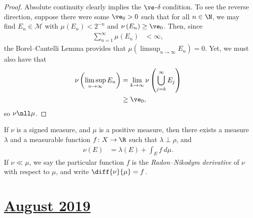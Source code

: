 \documentclass[10pt]{mypackage}
\begin{document}
\begin{proof}
  Absolute continuity clearly implies the $\ve$-$\delta$ condition. To see the reverse direction, suppose there were some $\ve_0 > 0$ such that for all $n\in \N$, we may find $E_n\in \mathcal{M}$ with $\mu\left( E_n \right) < 2^{-n}$ and $\nu\left( E_n \right) \geq \ve_0$. Then, since
  \begin{align*}
    \sum_{n=1}^{\infty}\mu\left( E_n \right) &< \infty,
  \end{align*}
  the Borel--Cantelli Lemma provides that $\mu\left( \limsup_{n\rightarrow\infty}E_n \right) = 0$. Yet, we must also have that
  \begin{align*}
    \nu\left( \limsup_{n\rightarrow\infty}E_n \right) &= \lim_{k\rightarrow\infty}\nu\left( \bigcup_{j=k}^{\infty}E_j \right)\\
                                                      &\geq \ve_0,
  \end{align*}
  so $\nu\nll\mu$.
\end{proof}
\begin{theorem}
  If $\nu$ is a signed measure, and $\mu$ is a positive measure, then there exists a measure $\lambda$ and a measurable function $f\colon X\rightarrow \R$ such that $\lambda\perp\rho$, and
  \begin{align*}
    \nu\left( E \right) &= \lambda\left( E \right) + \int_{E}^{} f\:d\mu.
  \end{align*}
  If $\nu\ll\mu$, we say the particular function $f$ is the \textit{Radon--Nikodym derivative} of $\nu$ with respect to $\mu$, and write $\diff{\nu}{\mu} = f$.
\end{theorem}
\section{\href{https://math.virginia.edu/graduate/exams/analysis/2019Aug_real.pdf}{August 2019}}%
\end{document}

